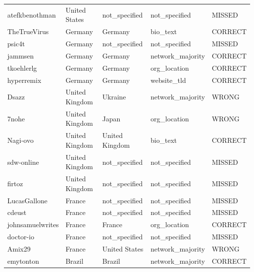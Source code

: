 \documentclass[11pt,a4paper]{article}
\begin{document}
\begin{longtable}{>{\ttfamily\small}p{4.4cm} p{3.0cm} p{3.0cm} p{2.6cm} p{1.6cm}}
\rowcolor{missed}   atefkbenothman            & United States  & not\_specified  & not\_specified   & MISSED  \\
\rowcolor{correct}  TheTrueVirus              & Germany        & Germany         & bio\_text        & CORRECT \\
\rowcolor{missed}   psic4t                    & Germany        & not\_specified  & not\_specified   & MISSED  \\
\rowcolor{correct}  jammsen                   & Germany        & Germany         & network\_majority & CORRECT \\
\rowcolor{correct}  tkoehlerlg                & Germany        & Germany         & org\_location    & CORRECT \\
\rowcolor{correct}  hyperremix                & Germany        & Germany         & website\_tld     & CORRECT \\
\rowcolor{wrong}    Dsazz                     & United Kingdom & Ukraine         & network\_majority & WRONG   \\
\rowcolor{wrong}    7nohe                     & United Kingdom & Japan           & org\_location    & WRONG   \\
\rowcolor{correct}  Nagi-ovo                  & United Kingdom & United Kingdom  & bio\_text        & CORRECT \\
\rowcolor{missed}   sdw-online                & United Kingdom & not\_specified  & not\_specified   & MISSED  \\
\rowcolor{missed}   firtoz                    & United Kingdom & not\_specified  & not\_specified   & MISSED  \\
\rowcolor{missed}   LucasGallone              & France         & not\_specified  & not\_specified   & MISSED  \\
\rowcolor{missed}   cdeust                    & France         & not\_specified  & not\_specified   & MISSED  \\
\rowcolor{correct}  johnsamuelwrites          & France         & France          & org\_location    & CORRECT \\
\rowcolor{missed}   doctor-io                 & France         & not\_specified  & not\_specified   & MISSED  \\
\rowcolor{wrong}    Amix29                    & France         & United States   & network\_majority & WRONG   \\
\rowcolor{correct}  emytonton                 & Brazil         & Brazil          & network\_majority & CORRECT \\

\end{longtable}
\end{document}
